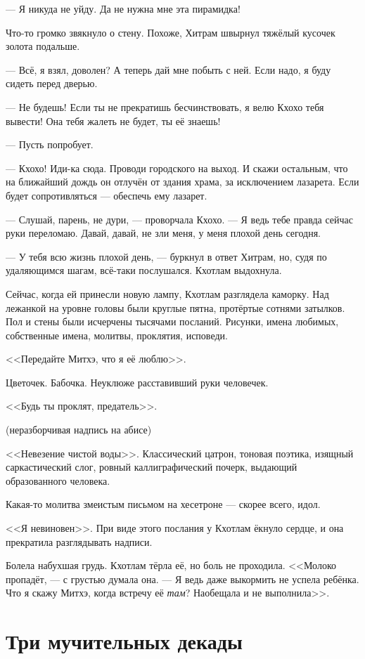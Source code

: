 \documentclass[a4paper,10pt,fleqn]{book}\usepackage{cooltooltips}\usepackage{polyglossia}\setdefaultlanguage{english}\setotherlanguage{russian}\defaultfontfeatures{Ligatures=TeX,Mapping=tex-text} \usepackage{xcolor}\definecolor{lightgray}{HTML}{bbbbbb}\color{lightgray}\newcommand{\ml}[3]{\textcolor{black}{#3}}
\newcommand{\asterism}{\vspace{1em}{\centering\Large\bfseries$\ast~\ast~\ast$\par}\vspace{1em}}
\begin{document}
--- Я никуда не уйду.
Да не нужна мне эта пирамидка!

Что-то громко звякнуло о стену.
Похоже, Хитрам швырнул тяжёлый кусочек золота подальше.

--- Всё, я взял, доволен?
А теперь дай мне побыть с ней.
Если надо, я буду сидеть перед дверью.

--- Не будешь!
Если ты не прекратишь бесчинствовать, я велю Кхохо тебя вывести!
Она тебя жалеть не будет, ты её знаешь!

--- Пусть попробует.

--- Кхохо!
Иди-ка сюда.
Проводи городского на выход.
И скажи остальным, что на ближайший дождь он отлучён от здания храма, за исключением лазарета.
Если будет сопротивляться --- обеспечь ему лазарет.

--- Слушай, парень, не дури, --- проворчала Кхохо.
--- Я ведь тебе правда сейчас руки переломаю.
Давай, давай, не зли меня, у меня плохой день сегодня.

--- У тебя всю жизнь плохой день, --- буркнул в ответ Хитрам, но, судя по удаляющимся шагам, всё-таки послушался.
Кхотлам выдохнула.

\asterism

Сейчас, когда ей принесли новую лампу, Кхотлам разглядела каморку.
Над лежанкой на уровне головы были круглые пятна, протёртые сотнями затылков.
Пол и стены были исчерчены тысячами посланий.
Рисунки, имена любимых, собственные имена, молитвы, проклятия, исповеди.

<<Передайте Митхэ, что я её люблю>>.

Цветочек.
Бабочка.
Неуклюже расставивший руки человечек.

<<Будь ты проклят, предатель>>.

(неразборчивая надпись на абисе)

<<Невезение чистой воды>>.
Классический цатрон, тоновая поэтика, изящный саркастический слог, ровный каллиграфический почерк, выдающий образованного человека.

Какая-то молитва змеистым письмом на хесетроне --- скорее всего, идол.

<<Я невиновен>>.
При виде этого послания у Кхотлам ёкнуло сердце, и она прекратила разглядывать надписи.

Болела набухшая грудь.
Кхотлам тёрла её, но боль не проходила.
<<Молоко пропадёт, --- с грустью думала она.
--- Я ведь даже выкормить не успела ребёнка.
Что я скажу Митхэ, когда встречу её \emph{там}?
Наобещала и не выполнила>>.

\section{Три мучительных декады}
\end{document}
